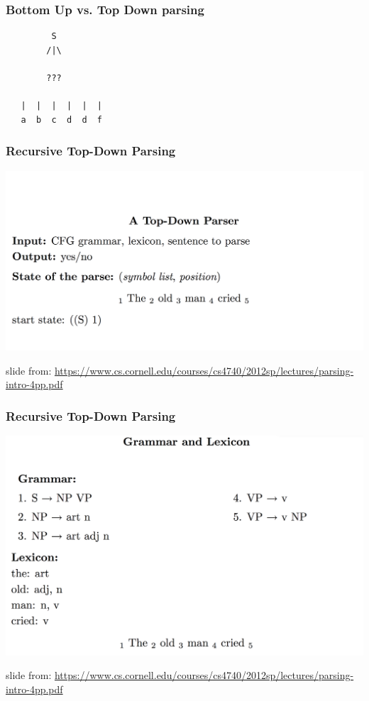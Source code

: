 \documentclass{beamer}
\begin{document}
\begin{frame}[fragile]
\frametitle{Bottom Up vs. Top Down parsing}

\begin{verbatim}
         S
        /|\
        
        ???
        
   |  |  |  |  |  |
   a  b  c  d  d  f 
\end{verbatim}


\end{frame}

\begin{frame}
\frametitle{Recursive Top-Down Parsing}
\includegraphics[width=\textwidth]{figures/top1}

{\tiny slide from: \url{https://www.cs.cornell.edu/courses/cs4740/2012sp/lectures/parsing-intro-4pp.pdf}}
\end{frame}

\begin{frame}
\frametitle{Recursive Top-Down Parsing}
\includegraphics[width=\textwidth]{figures/top2}

{\tiny slide from: \url{https://www.cs.cornell.edu/courses/cs4740/2012sp/lectures/parsing-intro-4pp.pdf}}

\end{frame}
\end{document}
